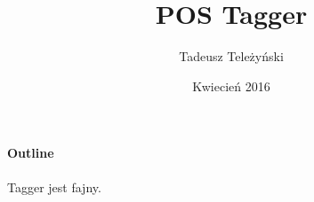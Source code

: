 \documentclass[12pt, a4paper]{article}
\title{POS Tagger}
\author{Tadeusz Teleżyński}
\date{Kwiecień 2016}
\begin{document}
\maketitle
\paragraph{Outline}
Tagger jest fajny.
\end{document}
